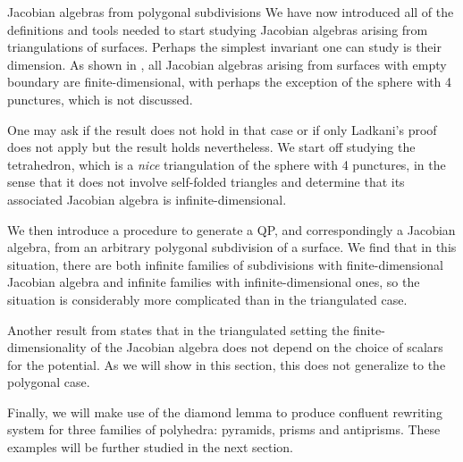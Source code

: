 \begin{chapter}{Jacobian algebras from polygonal subdivisions}
We have now introduced all of the definitions and tools needed to start studying Jacobian algebras arising from triangulations of surfaces. Perhaps the simplest invariant one can study is their dimension. As shown in \cite{Lad12}, all Jacobian algebras arising from surfaces with empty boundary are finite-dimensional, with perhaps the exception of the sphere with 4 punctures, which is not discussed. 

One may ask if the result does not hold in that case or if only Ladkani's proof does not apply but the result holds nevertheless. We start off studying the tetrahedron, which is a \emph{nice} triangulation of the sphere with 4 punctures, in the sense that it does not involve self-folded triangles and determine that its associated Jacobian algebra is infinite-dimensional.

We then introduce a procedure to generate a QP, and correspondingly a Jacobian algebra, from an arbitrary polygonal subdivision of a surface. We find that in this situation, there are both infinite families of subdivisions with finite-dimensional Jacobian algebra and infinite families with infinite-dimensional ones, so the situation is considerably more complicated than in the triangulated case.

Another result from \cite{Lad12} states that in the triangulated setting the finite-dimen\-sionality of the Jacobian algebra does not depend on the choice of scalars for the potential. As we will show in this section, this does not generalize to the polygonal case.

Finally, we will make use of the diamond lemma to produce confluent rewriting system for three families of polyhedra: pyramids, prisms and antiprisms. These examples will be further studied in the next section.


\end{chapter}
